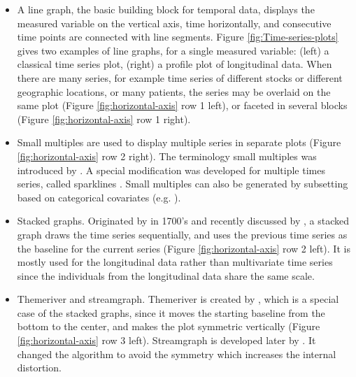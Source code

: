\documentclass[12pt]{article}
\newcommand{\red}[1]{{\color{red} #1}}
\begin{document}
\begin{itemize} \itemsep 0in
\item A line graph, the basic building block for temporal data, displays the measured variable on the vertical axis, time horizontally, and consecutive time points are connected with line segments. Figure \ref{fig:Time-series-plots} gives two examples of line graphs, for a single measured variable: (left) a classical time series plot, (right) a profile plot of longitudinal data. When there are many series, for example time series of different stocks or different geographic locations, or many patients, the series may be overlaid on the same plot (Figure \ref{fig:horizontal-axis} row 1 left), or faceted in several blocks (Figure \ref{fig:horizontal-axis} row 1 right).


\item Small multiples are used to display multiple series in separate plots (Figure \ref{fig:horizontal-axis} row 2 right). The terminology small multiples was introduced by \citet{tufte1983visual}. A special modification was developed for multiple times series, called sparklines \citet{tufte2006evidence}. Small multiples can also be generated by subsetting based on categorical covariates (e.g. \citet{cleveland1993}).

\item Stacked graphs. Originated by \citeauthor{playfair2005playfair} in
1700's and recently discussed by \citet{byron2008stacked,javed2010graphical,heer2010tour},
a stacked graph draws the time series sequentially, and uses the previous
time series as the baseline for the current series (Figure \ref{fig:horizontal-axis} row 2 left). It is mostly used
for the longitudinal data rather than multivariate time series since
the individuals from the longitudinal data share the same scale.

\item Themeriver and streamgraph. Themeriver is created by \citet{havre2000themeriver},
which is a special case of the stacked graphs, since it moves the
starting baseline from the bottom to the center, and makes the plot
symmetric vertically (Figure \ref{fig:horizontal-axis} row 3 left). Streamgraph is developed later by \citet{byron2008stacked}.
It changed the algorithm to avoid the symmetry which increases the
internal distortion.


\end{itemize}
\end{document}
